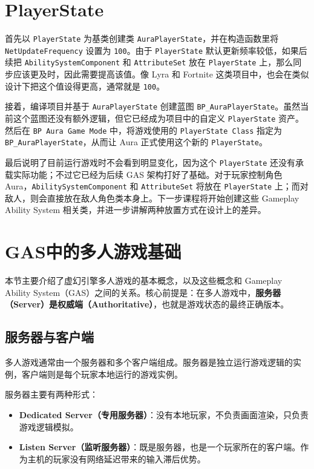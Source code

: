 \section{PlayerState}


首先以 \texttt{PlayerState} 为基类创建类 \texttt{AuraPlayerState}，并在构造函数里将\texttt{NetUpdateFrequency} 设置为 \texttt{100}。由于 \texttt{PlayerState} 默认更新频率较低，如果后续把 \texttt{AbilitySystemComponent} 和 \texttt{AttributeSet} 放在 \texttt{PlayerState} 上，那么同步应该更及时，因此需要提高该值。像 Lyra 和 Fortnite 这类项目中，也会在类似设计下把这个值设得更高，通常就是 \texttt{100}。

接着，编译项目并基于 \texttt{AuraPlayerState} 创建蓝图 \texttt{BP\_AuraPlayerState}。虽然当前这个蓝图还没有额外逻辑，但它已经成为项目中的自定义 \texttt{PlayerState} 资产。然后在 \texttt{BP Aura Game Mode} 中，将游戏使用的 \texttt{PlayerState Class} 指定为 \texttt{BP\_AuraPlayerState}，从而让 Aura 正式使用这个新的 \texttt{PlayerState}。

最后说明了目前运行游戏时不会看到明显变化，因为这个 \texttt{PlayerState} 还没有承载实际功能；不过它已经为后续 GAS 架构打好了基础。对于玩家控制角色 Aura，\texttt{AbilitySystemComponent} 和 \texttt{AttributeSet} 将放在 \texttt{PlayerState} 上；而对敌人，则会直接放在敌人角色类本身上。下一步课程将开始创建这些 Gameplay Ability System 相关类，并进一步讲解两种放置方式在设计上的差异。


\section{GAS中的多人游戏基础}

本节主要介绍了虚幻引擎多人游戏的基本概念，以及这些概念和 Gameplay Ability System（GAS）之间的关系。核心前提是：在多人游戏中，\textbf{服务器（Server）是权威端（Authoritative）}，也就是游戏状态的最终正确版本。

\subsection{服务器与客户端}

多人游戏通常由一个服务器和多个客户端组成。服务器是独立运行游戏逻辑的实例，客户端则是每个玩家本地运行的游戏实例。

服务器主要有两种形式：

\begin{itemize}
	\item \textbf{Dedicated Server（专用服务器）}：没有本地玩家，不负责画面渲染，只负责游戏逻辑模拟。
	\item \textbf{Listen Server（监听服务器）}：既是服务器，也是一个玩家所在的客户端。作为主机的玩家没有网络延迟带来的输入滞后优势。
\end{itemize}

